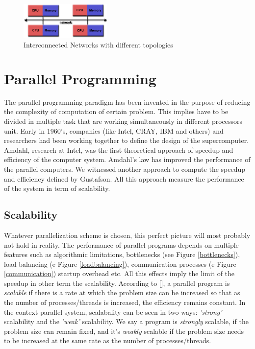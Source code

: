 \begin{figure}[!h]
\centering 
\includegraphics[width=0.4\textwidth]{images/d-memory.png}
\caption{Interconnected Networks with different topologies}
\label{dmemory} 
\end{figure}


\section{Parallel Programming} \label{scalability}
The parallel programming paradigm has been invented in the purpose of reducing the complexity of computation of certain problem. This implies have to be divided  in multiple task that are working simultaneously in different processors unit. Early in 1960's, companies (like Intel, CRAY, IBM and others) and researchers had been working together to define the design of the supercomputer. Amdahl, research at Intel, was the first theoretical approach of speedup and efficiency of the computer system. Amdahl's law has improved the performance of the parallel computers. We witnessed another approach to compute the speedup and efficiency defined by Gustafson. All this approach measure the performance of the system in term of scalability. 

\subsection{Scalability}
Whatever parallelization scheme is chosen, this perfect picture will most probably not hold in reality. The performance of parallel programs depends on multiple features such as algorithmic limitations, bottlenecks (see Figure \ref{bottlenecks}), load balancing (e Figure \ref{loadbalancing}), communication processes (e Figure \ref{communication}) startup overhead etc. All this effects imply the limit of the speedup in other term the scalability. According to [], a parallel program
is \textit{scalable} if there is a rate at which the problem size can be increased so that as the
number of processes/threads is increased, the efficiency remains constant. In the context parallel system,  scalabality can be seen in two ways: \textit{'strong'} scalability and the \textit{'weak'} scalability. We say a program is \textit{strongly} scalable, if the problem size can remain fixed, and it's \textit{weakly} scalable if the problem size needs to be increased at the same rate as the number of processes/threads.  

